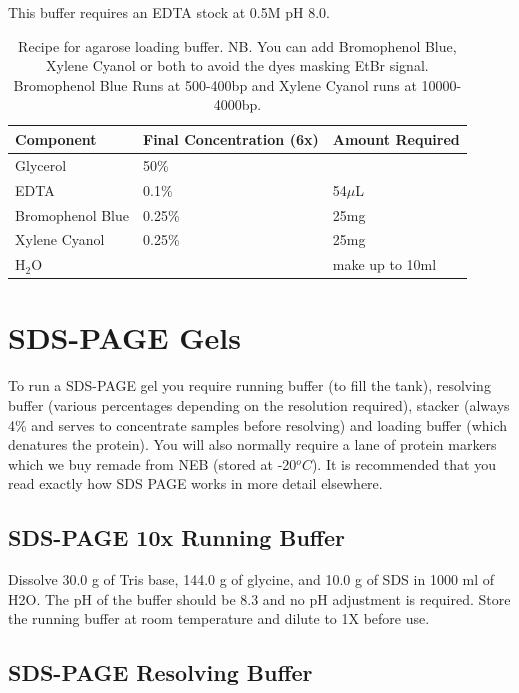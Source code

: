 \documentclass{tufte-book} %
\begin{document}
This buffer requires an EDTA stock at 0.5M pH 8.0.

\begin{table}[ht]
  \centering
  \selectfont
  \begin{tabular}{lll}
    \toprule
    Component & Final Concentration (6x) & Amount  Required \\
    \midrule
   Glycerol 			& 50\% & 	\footnotemark{} \\
   EDTA 			& 0.1\% & 54$\mu$L 	\\
   Bromophenol Blue	& 0.25\% & 25mg 	\\
   Xylene Cyanol	& 0.25\% & 25mg 	\\
   H$_{2}$O 		& & make up to 10ml	\\

    \bottomrule
  \end{tabular}
  \caption{Recipe for agarose loading buffer. NB. You can add Bromophenol Blue, Xylene Cyanol or both to avoid the dyes masking EtBr signal. Bromophenol Blue Runs at 500-400bp and Xylene Cyanol runs at 10000-4000bp.}
  \label{tab:TAE}
\end{table}
  
\newpage
\section{SDS-PAGE Gels}

To run a SDS-PAGE gel you require running buffer (to fill the tank), resolving buffer (various percentages depending on the resolution required), stacker (always 4\% and serves to concentrate samples before resolving) and loading buffer (which denatures the protein). You will also normally require a lane of protein markers which we buy remade from NEB (stored at -20$^{o}C$). It is recommended that you read exactly how SDS PAGE works in more detail elsewhere.

\subsection{SDS-PAGE 10x Running Buffer}

Dissolve 30.0 g of Tris base, 144.0 g of glycine, and 10.0 g of SDS in 1000 ml of H2O. The pH of the buffer should be 8.3 and no pH adjustment is required. Store the running buffer at room temperature and dilute to 1X before use.

\subsection{SDS-PAGE Resolving Buffer}
\end{document}
